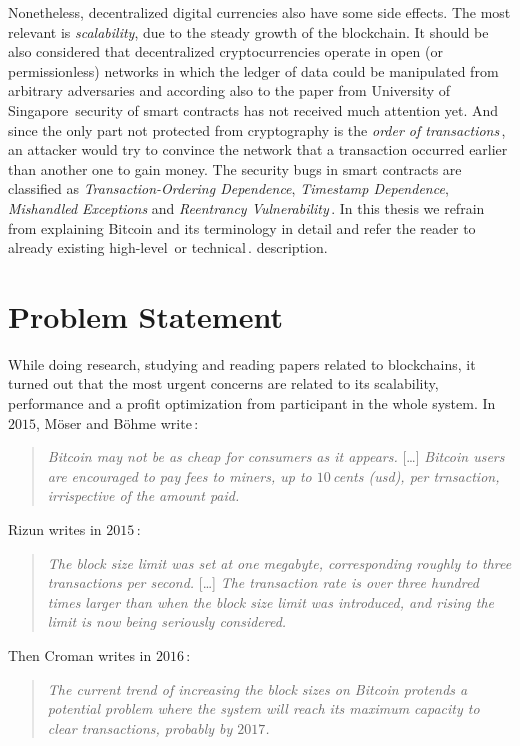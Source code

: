 \documentclass[USenglish]{uit-thesis}
\begin{document}
Nonetheless, decentralized digital currencies also have some side effects.
The most relevant is \emph{scalability}, due to the steady growth of the
blockchain. It should be also considered that
decentralized cryptocurrencies operate in open (or permissionless) networks
in which the ledger of data could be manipulated from arbitrary adversaries and
according also to the paper from University of Singapore\,\cite{Luu:2016}
security of smart contracts has not received much attention yet. And since the
only part not protected from cryptography is the \emph{order of transactions}\,\cite{ethereum_white_paper},
an attacker would try to convince the network that a transaction
occurred earlier than another one to gain money.
The security bugs in smart contracts are classified as \emph{Transaction-Ordering Dependence},
\emph{Timestamp Dependence}, \emph{Mishandled Exceptions}
and \emph{Reentrancy Vulnerability}\,\cite{Luu:2016}.
In this thesis we refrain from explaining Bitcoin and its terminology in detail
and refer the reader to already existing high-level\,\cite{Underwood:2016:BBB,
Bohme2015BETG}
or technical\,\cite{Nakamoto_bitcoin, ethereum_white_paper}.
 description.
\section{Problem Statement}
\label{sec:probdefinition}
While doing research, studying and reading papers related to blockchains,
it turned out that the most urgent concerns are related to
its scalability, performance and a profit optimization from participant
in the whole system.
In $2015$, Möser and Böhme write\,\cite{Moser2015}:
\begin{quote}
	\emph{Bitcoin may not be as cheap for consumers as it appears.}
	[\dots]
	\emph{Bitcoin users are encouraged to pay fees to miners, up
	to $10$\,cents (\gls{usd}), per trnsaction, irrispective of the amount
paid.}
\end{quote}

Rizun writes in $2015$\,\cite{Rizun:2015:blocksizelimit}:
\begin{quote}
	\emph{The block size limit was set at one megabyte, corresponding
		roughly to three transactions per second.}
		[\dots]
		\emph{The transaction rate is over three hundred times larger
		than when the block size limit was introduced, and rising the limit
		is now being seriously considered.}
\end{quote}
Then Croman writes in $2016$\,\cite{croman2016}:
\begin{quote}
\emph{The current trend of increasing the block sizes on Bitcoin protends
a potential problem where the system will reach its maximum capacity to clear
transactions, probably by $2017$.}
\end{quote}
\end{document}
